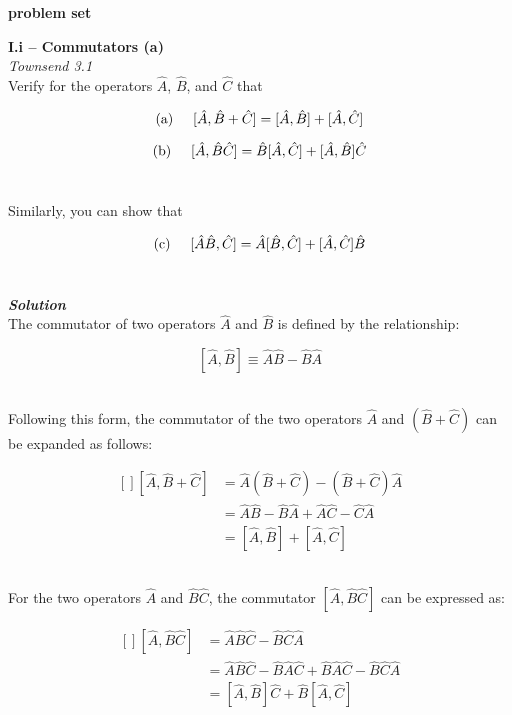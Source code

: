 \documentclass[9pt]{extarticle}
\newcommand{\bfit}[1]{\textbf{\textit{#1}}}
\begin{document}
\setlength{\parindent}{0pt}

{\huge \bf problem set} 

\noindent \hrulefill

\begin{multicols*}{2}

{\bf \LARGE I.i -- Commutators (a)} \\

{\it Townsend 3.1} \\ 
Verify for the operators $\hat A$, $\hat B$, and $\hat C$ that

$$(\text a) \hspace{0.5cm} [\hat A, \hat B + \hat C] = [\hat A, \hat B] + [\hat A, \hat C]$$

$$(\text b) \hspace{0.5cm} [\hat A, \hat B \hat C] = \hat B[\hat A, \hat C] + [\hat A, \hat B] \hat C$$ \ 

Similarly, you can show that

$$(\text c) \hspace{0.5cm} [\hat A \hat B, \hat C] = \hat A[\hat B, \hat C] + [\hat A, \hat C] \hat B$$ \ 

{\bfit{Solution}} \\ 
The commutator of two operators $\hat A$ and $\hat B$ is defined by the relationship:

$$[\hat A, \hat B] \equiv \hat A \hat B - \hat B \hat A$$ \ 

Following this form, the commutator of the two operators $\hat A$ and $(\hat B + \hat C)$ can be expanded as follows:

$$
\begin{aligned}[]
	[ \hat A, \hat B + \hat C] &= \hat A (\hat B + \hat C) - (\hat B + \hat C) \hat A \\ 
	&= \hat A \hat B - \hat B \hat A + \hat A \hat C - \hat C \hat A \\ 
	&= [\hat A, \hat B] + [\hat A, \hat C]
\end{aligned}
$$ \ 

For the two operators $\hat A$ and $\hat B \hat C$, the commutator $[\hat A, \hat B \hat C]$ can be expressed as:

$$
\begin{aligned}[]
	[\hat A , \hat B \hat C] &= \hat A \hat B \hat C - \hat B \hat C \hat A \\
	&= \hat A \hat B \hat C - \hat B \hat A \hat C + \hat B \hat A \hat C - \hat B \hat C \hat A \\
	&= [\hat A, \hat B] \hat C + \hat B [\hat A, \hat C] 
\end{aligned}	
$$ \ 


\end{multicols*}
\end{document}
